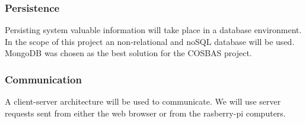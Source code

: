\subsubsection{Persistence}
Persisting system valuable information will take place in a database environment. In the scope of this project an non-relational and noSQL database will be used. MongoDB was chosen as the best solution for the COSBAS project.

\subsubsection{Communication}
A client-server architecture will be used to communicate. We will use server requests sent from either the web browser or from the rasberry-pi computers.